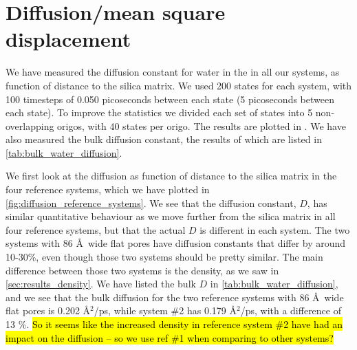 \section{Diffusion/mean square displacement}




We have measured the diffusion constant for water in the in all our systems, as function of distance to the silica matrix. We used 200 states for each system, with 100 timesteps of 0.050 picoseconds between each state (5 picoseconds between each state). To improve the statistics we divided each set of states into 5 non-overlapping origos, with 40 states per origo. The results are plotted in . We have also measured the bulk diffusion constant, the results of which are listed in \cref{tab:bulk_water_diffusion}.

We first look at the diffusion as function of distance to the silica matrix in the four reference systems, which we have plotted in \cref{fig:diffusion_reference_systems}. We see that the diffusion constant, $D$, has similar quantitative behaviour as we move further from the silica matrix in all four reference systems, but that the actual $D$ is different in each system. The two systems with 86 \AA\ wide flat pores have diffusion constants that differ by around 10-30\%, even though those two systems should be pretty similar. The main difference between those two systems is the density, as we saw in \cref{sec:results_density}. We have listed the bulk $D$ in \cref{tab:bulk_water_diffusion}, and we see that the bulk diffusion for the two reference systems with 86 \AA\ wide flat pores is {0.202 \AA$^2$/ps}, while system \#2 has {0.179 \AA$^2$/ps}, with a difference of {13 \%}. \hl{So it seems like the increased density in reference system \#2 have had an impact on the diffusion -- so we use ref \#1 when comparing to other systems?}
%
%

